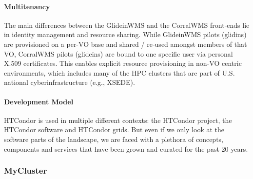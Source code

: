 \documentclass{sig-alternate}
\begin{document}
\paragraph{Multitenancy}

The main differences between the GlideinWMS and the CorralWMS front-ends lie in
identity management and resource sharing.
While GlideinWMS pilots (glidins) are provisioned on a per-VO base and shared /
re-used amongst members of that VO, CorralWMS pilots (glideins) are bound to
one specific user via personal X.509 certificates.
This enables explicit resource provisioning in non-VO centric environments,
which includes many of the HPC clusters that are part of U.S. national
cyberinfrastructure (e.g., XSEDE).

\paragraph{Development Model}

HTCondor is used in multiple different contexts: the HTCondor project,
the HTCondor software and HTCondor grids.
But even if we only look at the software parts of the landscape, we are faced
with a plethora of concepts, components and services that have been
grown and curated for the past 20 years.

%
%
\subsubsection{MyCluster}
\label{sec:mycluster}
\end{document}
